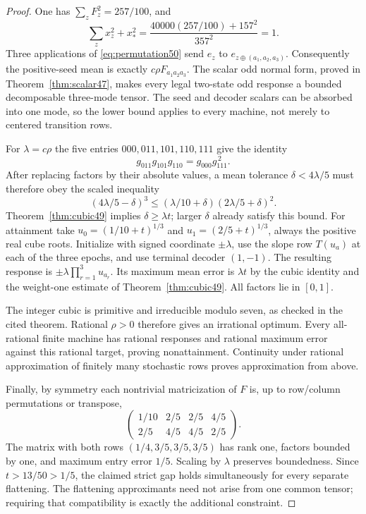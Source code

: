 \begin{proof}
One has $\sum_zF_z^2=257/100$, and
\[
 \sum_z x_z^2+x_*^2
 =\frac{40000(257/100)+157^2}{357^2}=1.
\]
Three applications of \eqref{eq:permutation50} send $e_z$ to
$e_{z\oplus(a_1,a_2,a_3)}$. Consequently the positive-seed mean is
exactly $c\rho F_{a_1a_2a_3}$. The scalar odd normal form, proved in
Theorem~\ref{thm:scalar47}, makes every legal two-state odd response a
bounded decomposable three-mode tensor. The seed and decoder scalars
can be absorbed into one mode, so the lower bound applies to every
machine, not merely to centered transition rows.

For $\lambda=c\rho$ the five entries
$000,011,101,110,111$ give the identity
\[
 g_{011}g_{101}g_{110}=g_{000}g_{111}^{\,2}.
\]
After replacing factors by their absolute values, a mean tolerance
$\delta<4\lambda/5$ must therefore obey the scaled inequality
\[
 (4\lambda/5-\delta)^3
       \le(\lambda/10+\delta)(2\lambda/5+\delta)^2.
\]
Theorem~\ref{thm:cubic49} implies $\delta\ge\lambda t$; larger
$\delta$ already satisfy this bound. For attainment take
$u_0=(1/10+t)^{1/3}$ and $u_1=(2/5+t)^{1/3}$, always the positive
real cube roots. Initialize with signed coordinate $\pm\lambda$,
use the slope row $T(u_a)$ at each of the three epochs, and use
terminal decoder $(1,-1)$. The resulting response is
$\pm\lambda\prod_{r=1}^3u_{a_r}$. Its maximum mean error is
$\lambda t$ by the cubic identity and the weight-one estimate of
Theorem~\ref{thm:cubic49}. All factors lie in $[0,1]$.

The integer cubic is primitive and irreducible modulo seven, as checked
in the cited theorem. Rational $\rho>0$ therefore gives an irrational
optimum. Every all-rational finite machine has rational responses and
rational maximum error against this rational target, proving
nonattainment. Continuity under rational approximation of finitely
many stochastic rows proves approximation from above.

Finally, by symmetry each nontrivial matricization of $F$ is, up to
row/column permutations or transpose,
\[
 \begin{pmatrix}1/10&2/5&2/5&4/5\\
                 2/5&4/5&4/5&2/5\end{pmatrix}.
\]
The matrix with both rows $(1/4,3/5,3/5,3/5)$ has rank one, factors
bounded by one, and maximum entry error $1/5$. Scaling by $\lambda$
preserves boundedness. Since $t>13/50>1/5$, the claimed strict gap
holds simultaneously for every separate flattening. The flattening
approximants need not arise from one common tensor; requiring that
compatibility is exactly the additional constraint.
\end{proof}

